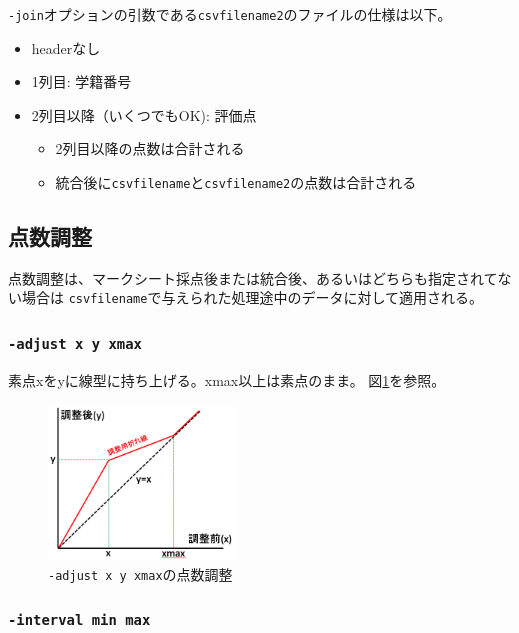 \texttt{-join}オプションの引数である\texttt{csvfilename2}のファイルの仕様は以下。

\begin{itemize}
\item headerなし

\item 1列目: 学籍番号

\item 2列目以降（いくつでもOK): 評価点

\begin{itemize}
\item 2列目以降の点数は合計される

\item 統合後に\texttt{csvfilename}と\texttt{csvfilename2}の点数は合計される

\end{itemize}

\end{itemize}

\subsection{点数調整}
\label{点数調整}

点数調整は、マークシート採点後または統合後、あるいはどちらも指定されてない場合は
\texttt{csvfilename}で与えられた処理途中のデータに対して適用される。

\subsubsection{\texttt{-adjust x y xmax}}
\label{-adjustxyxmax}

素点xをyに線型に持ち上げる。xmax以上は素点のまま。
図\ref{fig:adjust}を参照。

\begin{figure}[htbp]
\centering
\includegraphics[keepaspectratio,width=5cm,height=0.75\textheight]{fig/adjust.png}
\caption{\texttt{-adjust x y xmax}の点数調整}
\label{fig:adjust}
\end{figure}

\subsubsection{\texttt{-interval min max}}
\label{-intervalminmax}

